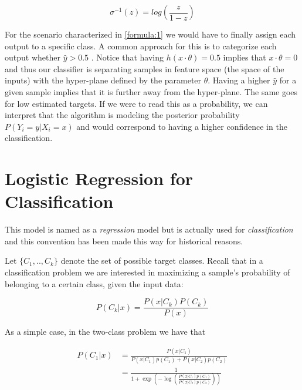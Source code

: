 \begin{equation} \label{eq:logitFunction}
\sigma^{-1}(z) = log( \frac{z}{1 - z})
\end{equation}

For the scenario characterized in \cref{formula:1} we would have to finally assign each output to a specific class. A common approach for this is to categorize each output whether $\hat{y} > 0.5$ \label{formula:logitThreshold}. Notice that having $h(x \cdot \theta) = 0.5$ implies that $x \cdot \theta = 0$ and thus our classifier is separating samples in feature space (the space of the inputs) with the hyper-plane defined by the parameter $\theta$. Having a higher $\hat{y}$ for a given sample implies that it is further away from the hyper-plane. The same goes for low estimated targets. If we were to read this as a probability, we can interpret that the algorithm is modeling the posterior probability $P(Y_i = y | X_i = x)$ and would correspond to having a higher confidence in the classification.




\section{Logistic Regression for Classification}\label{section-logisticRegression}

This model is named as a \textit{regression} model but is actually used for \textit{classification} and this convention has been made this way for historical reasons.


Let $\{C_1,..,C_k\}$ denote the set of possible target classes. Recall that in a classification problem we are interested in maximizing a sample's probability of belonging to a certain class, given the input data:

\begin{equation}
P(C_k| x) = \frac{P(x|C_k)P(C_k)}{P(x)} 
\end{equation}

As a simple case, in the two-class problem we have that


\begin{equation}
\begin{split}
P(C_1| x) & = \frac{P(x|C_1) }{P(x|C_1)p(C_1) + P(x|C_2)p(C_2)} \\
& = \frac{1 }
{1 + \exp(- \log( \frac{ P(x|C_1)p(C_1)}
{P(x|C_2)p(C_2)
}))
}
\end{split}
\end{equation}

